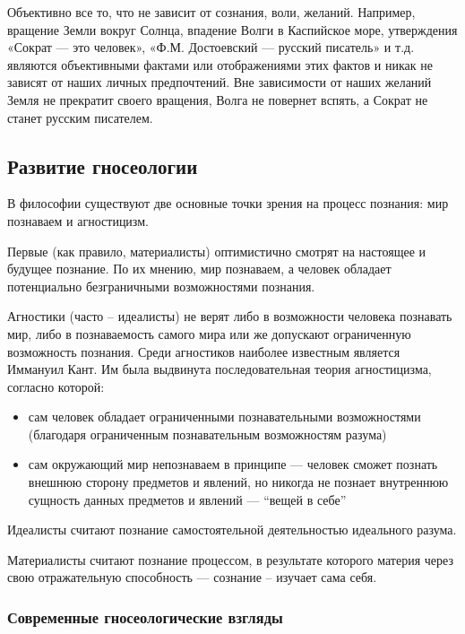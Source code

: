 \documentclass[
]{article}
\begin{document}
Объективно все то, что не зависит от сознания, воли, желаний. Например,
вращение Земли вокруг Солнца, впадение Волги в Каспийское море,
утверждения «Сократ --- это человек», «Ф.М. Достоевский --- русский
писатель» и т.д. являются объективными фактами или отображениями этих
фактов и никак не зависят от наших личных предпочтений. Вне зависимости
от наших желаний Земля не прекратит своего вращения, Волга не повернет
вспять, а Сократ не станет русским писателем.

\hypertarget{ux440ux430ux437ux432ux438ux442ux438ux435-ux433ux43dux43eux441ux435ux43eux43bux43eux433ux438ux438}{%
\subsection{Развитие
гносеологии}\label{ux440ux430ux437ux432ux438ux442ux438ux435-ux433ux43dux43eux441ux435ux43eux43bux43eux433ux438ux438}}

В философии существуют две основные точки зрения на процесс познания:
мир познаваем и агностицизм.

Первые (как правило, материалисты) оптимистично смотрят на настоящее и
будущее познание. По их мнению, мир познаваем, а человек обладает
потенциально безграничными возможностями познания.

Агностики (часто -- идеалисты) не верят либо в возможности человека
познавать мир, либо в познаваемость самого мира или же допускают
ограниченную возможность познания. Среди агностиков наиболее известным
является Иммануил Кант. Им была выдвинута последовательная теория
агностицизма, согласно которой:

\begin{itemize}
\item
  сам человек обладает ограниченными познавательными возможностями
  (благодаря ограниченным познавательным возможностям разума)
\item
  сам окружающий мир непознаваем в принципе --- человек сможет познать
  внешнюю сторону предметов и явлений, но никогда не познает внутреннюю
  сущность данных предметов и явлений --- ``вещей в себе''
\end{itemize}

Идеалисты считают познание самостоятельной деятельностью идеального
разума.

Материалисты считают познание процессом, в результате которого материя
через свою отражательную способность --- сознание -- изучает сама себя.

\hypertarget{ux441ux43eux432ux440ux435ux43cux435ux43dux43dux44bux435-ux433ux43dux43eux441ux435ux43eux43bux43eux433ux438ux447ux435ux441ux43aux438ux435-ux432ux437ux433ux43bux44fux434ux44b}{%
\subsubsection{Современные гносеологические
взгляды}\label{ux441ux43eux432ux440ux435ux43cux435ux43dux43dux44bux435-ux433ux43dux43eux441ux435ux43eux43bux43eux433ux438ux447ux435ux441ux43aux438ux435-ux432ux437ux433ux43bux44fux434ux44b}}
\end{document}
